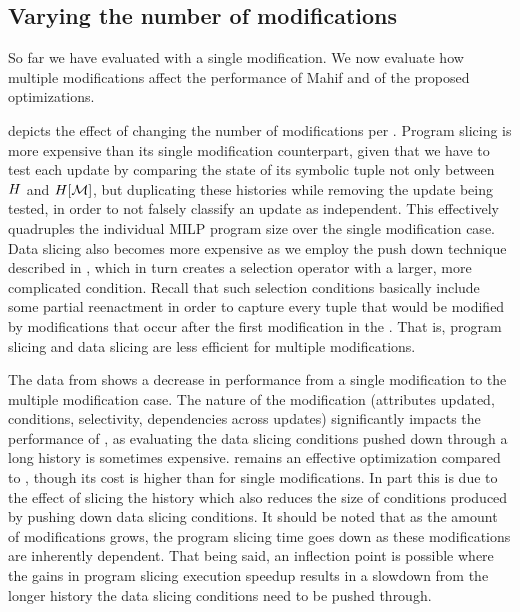 \subsection{Varying the number of modifications}\label{sec:vary-numb-modif}
So far we have evaluated \abbrHWs with a single modification. We now evaluate how multiple modifications affect the performance of Mahif and of the proposed optimizations.

 depicts the effect of changing the number of modifications per \abbrHW. Program slicing is more expensive than its single modification counterpart, given that we have to test each update by comparing the state of its symbolic tuple not only between $H$ and $H[\mathcal{M}]$, but duplicating these histories while removing the update being tested, in order to not falsely classify an update as independent. This effectively quadruples the individual MILP program size over the single modification case. Data slicing also becomes more expensive as we employ the push down technique described in , which in turn creates a selection operator with a  larger, more complicated condition. Recall that such selection conditions basically include some partial reenactment in order to capture every tuple that would be modified by modifications that occur after the first modification in the \abbrHW. That is, program slicing and data slicing are less efficient for multiple modifications.

The data from  shows a decrease in performance from a single modification to the multiple modification case. The nature of the modification (attributes updated, conditions, selectivity, dependencies across updates) significantly impacts the performance of \mrd, as evaluating the data slicing conditions pushed down through a long history is sometimes expensive. \mrdp remains an effective optimization compared to \mr, though its cost is higher than for single modifications. In part this is due to the effect of slicing the history which also reduces the size of conditions produced by pushing down  data slicing conditions. It should be noted that as the amount of modifications grows, the program slicing time goes down as these modifications are inherently dependent. That being said, an inflection point is possible where the gains in program slicing execution speedup results in a slowdown from the longer history the data slicing conditions need to be pushed through.

